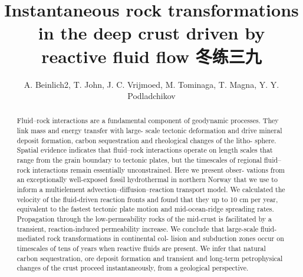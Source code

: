 \documentclass[a4paper]{article}
\title{Instantaneous rock transformations in the deep crust driven by reactive fluid flow 冬练三九}
\author{A. Beinlich2, T. John, J. C. Vrijmoed, M. Tominaga, T. Magna, Y. Y. Podladchikov}
\begin{document}
\maketitle

\begin{abstract}
Fluid–rock interactions are a  fundamental component of geodynamic processes. They link mass and energy transfer with large- scale tectonic deformation and drive mineral deposit formation, carbon sequestration and rheological changes of the litho- sphere. Spatial evidence indicates that fluid–rock interactions operate on length scales that range from the grain boundary to tectonic plates, but the timescales of regional fluid–rock interactions remain essentially unconstrained. Here we present obser- vations from an exceptionally well-exposed fossil hydrothermal  in northern Norway that we use to inform a multielement advection–diffusion–reaction transport model. We calculated the velocity of the fluid-driven reaction fronts and found that they  up to 10 cm per year, equivalent to the fastest tectonic plate motion and mid-ocean-ridge spreading rates. Propagation through the low-permeability rocks of the mid-crust is facilitated by a transient, reaction-induced permeability increase.  We conclude that large-scale fluid-mediated rock transformations in continental col- lision and subduction zones occur on timescales of tens of years when reactive fluids are present. We infer that natural carbon sequestration, ore deposit formation and transient and long-term petrophysical changes of the crust proceed instantaneously, from a geological perspective.
\end{abstract}






\end{document}
